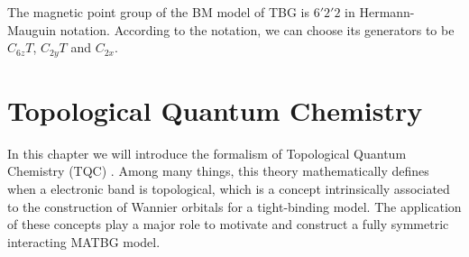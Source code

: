 \documentclass[12pt]{report}
\begin{document}
\begin{example} \label{ex:magnetic_group_tbg_6'2'2}
The magnetic point group of the BM model of TBG is $6'2'2$ in Hermann-Mauguin notation. According to the notation, we can choose its generators to be $C_{6z} T$, $C_{2y} T$ and $C_{2x}$.
\end{example}

\section{Topological Quantum Chemistry} \label{sec:topological_quantum_chemistry}


In this chapter we will introduce the formalism of Topological Quantum Chemistry (TQC) \cite{topological_quantum_chemistry2017, building_blocks2018, lectures_tms2017}. Among many things, this theory mathematically defines when a electronic band is topological, which is a concept intrinsically associated to the construction of Wannier orbitals for a tight-binding model. The application of these concepts play a major role to motivate and construct a fully symmetric interacting MATBG model.


%
\end{document}
